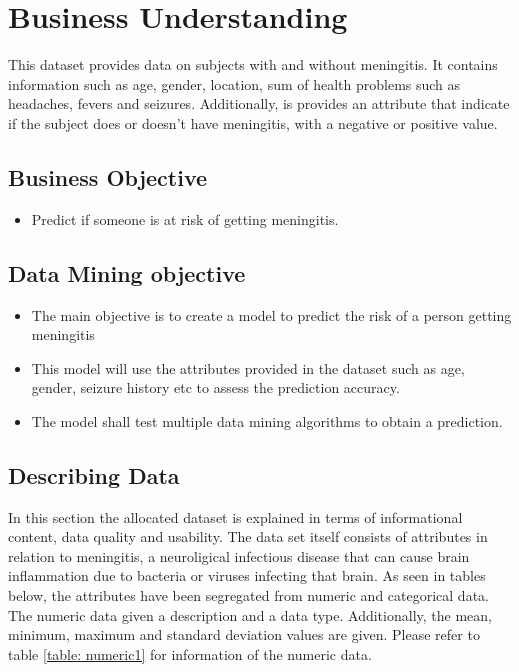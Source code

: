 
\section*{Business Understanding}
This dataset provides data on subjects with and without meningitis. It contains information such as age, gender, location, sum of health problems such as headaches, fevers and seizures. Additionally, is provides an attribute that indicate if the subject does or doesn't have meningitis, with a negative or positive value. 

\subsection*{Business Objective}

\begin{itemize}
	\item  Predict if someone is at risk of getting meningitis.
\end{itemize}

\subsection*{Data Mining objective}
\begin{itemize}
	\item The main objective is to create a model to predict the risk of a person getting meningitis 
	\item This model will use the attributes provided in the dataset such as age, gender, seizure history etc to assess the prediction accuracy.
	\item The model shall test multiple data mining algorithms to obtain a prediction.
\end{itemize}





\subsection*{Describing Data}
In this section the allocated dataset is explained in terms of informational content, data quality and usability. The data set itself consists of attributes in relation to meningitis, a neuroligical infectious disease that can cause brain inflammation due to bacteria or viruses infecting that brain. As seen in tables below, the attributes have been segregated from numeric and categorical data. The numeric data given a description and a data type. Additionally, the mean, minimum, maximum and standard deviation values are given. Please refer to table \ref{table: numeric1} for information of the numeric data.



